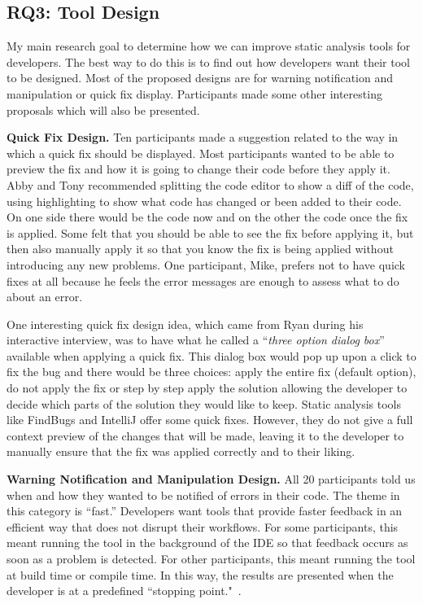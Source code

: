\subsection{RQ3: Tool Design}
\label{subsec:rq3}

My main research goal to determine how we can improve static analysis tools for
developers. The best way to do this is to find out how developers want their
tool to be designed. Most of the proposed designs are for warning notification
and manipulation or quick fix display. Participants made some other interesting
proposals which will also be presented.

\textbf{Quick Fix Design.}
Ten participants made a suggestion related to the way in which a quick
fix should be displayed. Most participants wanted to be able to preview
the fix and how it is going to change their code before they apply it. Abby and
Tony recommended splitting the code editor to show a diff of the code, using
highlighting to show what code has changed or been added to their code. On one
side there would be the code now and on the other the code once the fix is
applied. Some felt that you should be able to see the fix before applying it,
but then also manually apply it so that you know the fix is being
applied without introducing any new problems.
One participant, Mike, prefers not to have quick fixes at all because he feels the error messages are enough to
assess what to do about an error.

One interesting quick fix design idea, which came from Ryan during his
interactive interview, was to have what he called a ``\emph{three option dialog
box}'' available when applying a quick fix. This dialog box would pop up upon a
click to fix the bug and there would be three choices: apply the entire fix
(default option), do not apply the fix or step by step apply the solution
allowing the developer to decide which parts of the solution they would like to
keep. Static analysis tools like FindBugs and IntelliJ offer some quick fixes.
However, they do not give a full context preview of the changes that will be
made, leaving it to the developer to manually ensure that the fix was applied
correctly and to their liking.


\textbf{Warning Notification and Manipulation Design.} All 20 participants told us when and how they wanted to be notified of errors in their
code. The theme in this category is ``fast.'' Developers want tools that provide
faster feedback in an efficient way that does not disrupt their workflows. For
some participants, this meant running the tool in the background of the
IDE so that feedback occurs as soon as a problem is detected.
For other participants, this meant running the tool at build time or compile
time.  In this way, the results are presented when the developer is at a predefined ``stopping point."~\cite{Layman:2007:FaultFix}.

